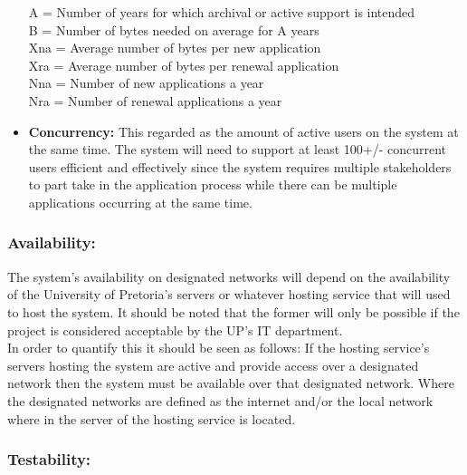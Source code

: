 \begin{flushleft}
\begin{itemize}
A = Number of years for which archival or active support is intended\\
B = Number of bytes needed on average for A years\\
Xna = Average number of bytes per new application\\
Xra = Average number of bytes per renewal application\\
Nna = Number of new applications a year\\
Nra = Number of renewal applications a year\\

\item\textbf{Concurrency:} This regarded as the amount of active users on the system at the same time.
The system will need to support at least 100+/- concurrent users efficient and effectively since the system requires multiple stakeholders to part take in the application process while there can be multiple applications occurring at the same time.\\

\end{itemize}
\end{flushleft}
\vspace{0.1in}

\subsubsection{Availability:}

\begin{flushleft}

The system's availability on designated networks will depend on the availability of the University of Pretoria's servers or whatever hosting service that will used to host the system. It should be noted that the former will only be possible if the project is considered acceptable by the UP's IT department.\\
In order to quantify this it should be seen as follows: If the hosting service's servers hosting the system are active and provide access over a designated network then the system must be available over that designated network. Where the designated networks are defined as the internet and/or the local network where in the server of the hosting service is located.

\end{flushleft}

\vspace{0.1in}

\subsubsection{Testability:}


